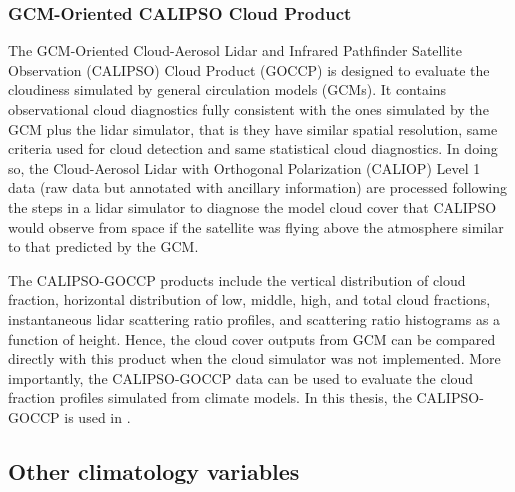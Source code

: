 \subsubsection{GCM-Oriented CALIPSO Cloud Product}

The GCM-Oriented Cloud-Aerosol Lidar and Infrared Pathfinder Satellite Observation (CALIPSO) Cloud Product (GOCCP) \citep[CALIPSO-GOCCP hereafter;][]{Chepfer2010} is designed to evaluate the cloudiness simulated by general circulation models (GCMs). It contains observational cloud diagnostics fully consistent with the ones simulated by the GCM plus the lidar simulator, that is they have similar spatial resolution, same criteria used for cloud detection and same statistical cloud diagnostics. In doing so, the Cloud-Aerosol Lidar with Orthogonal Polarization (CALIOP) Level 1 data (raw data but annotated with ancillary information) are processed following the steps in a lidar simulator to diagnose the model cloud cover that CALIPSO would observe from space if the satellite was flying above the atmosphere similar to that predicted by the GCM. 

The CALIPSO-GOCCP products include the vertical distribution of cloud fraction, horizontal distribution of low, middle, high, and total cloud fractions, instantaneous lidar scattering ratio profiles, and scattering ratio histograms as a function of height. Hence, the cloud cover outputs from GCM can be compared directly with this product when the cloud simulator was not implemented. More importantly, the CALIPSO-GOCCP data can be used to evaluate the cloud fraction profiles simulated from climate models. In this thesis, the CALIPSO-GOCCP is used in .

\subsection{Other climatology variables}


